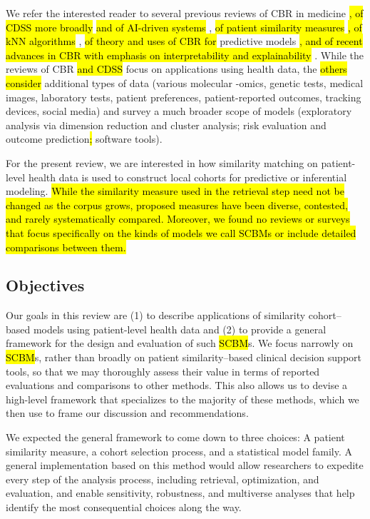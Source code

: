 \documentclass[sn-mathphys,Numbered,pdflatex]{sn-jnl}
\theoremstyle{remark}
\theoremstyle{definition}
\begin{document}
We refer the interested reader to several previous reviews of CBR in
medicine
\citep{Gierl1998, Begum2011, Choudhury2016}\hl{, of CDSS more broadly }\citep{Wasylewicz2019}\hl{ and of AI-driven systems }\citep{Elhaddad2024},
\hl{of patient similarity measures}
\citep{Dai2020}\hl{, of kNN algorithms }\citep{Halder2024},
\hl{of theory and uses of CBR for} predictive models
\citep{Welch2013, Sharafoddini2017, Parimbelli2018, Badra2023}\hl{, and of recent advances in CBR with emphasis on interpretability and explainability }\citep{Schoenborn2021, Rudin2022}.
While the reviews of CBR \hl{and CDSS }focus on applications using
health data, the \hl{others consider }additional types of data (various
molecular -omics, genetic tests, medical images, laboratory tests,
patient preferences, patient-reported outcomes, tracking devices, social
media) and survey a much broader scope of models (exploratory analysis
via dimension reduction and cluster analysis; risk evaluation and
outcome prediction\hl{; }software tools).

For the present review, we are interested in how similarity matching on
patient-level health data is used to construct local cohorts for
predictive or inferential
modeling.\hl{ While the similarity measure used in the retrieval step need not be changed as the corpus grows, proposed measures have been diverse, contested, and rarely systematically compared. Moreover, we found no reviews or surveys that focus specifically on the kinds of models we call SCBMs or include detailed comparisons between them.}

\subsection{Objectives}\label{objectives}

Our goals in this review are (1) to describe applications of similarity
cohort--based models using patient-level health data and (2) to provide
a general framework for the design and evaluation of such \hl{SCBM}s. We
focus narrowly on \hl{SCBM}s, rather than broadly on patient
similarity--based clinical decision support tools, so that we may
thoroughly assess their value in terms of reported evaluations and
comparisons to other methods. This also allows us to devise a high-level
framework that specializes to the majority of these methods, which we
then use to frame our discussion and recommendations.

We expected the general framework to come down to three choices: A
patient similarity measure, a cohort selection process, and a
statistical model family. A general implementation based on this method
would allow researchers to expedite every step of the analysis process,
including retrieval, optimization, and evaluation, and enable
sensitivity, robustness, and multiverse analyses that help identify the
most consequential choices along the way.
\end{document}
